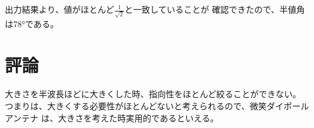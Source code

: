 \documentclass[dvipdfmx,autodetect-engine,titlepage]{jsarticle}
\begin{document}
出力結果より、値がほとんど\begin{math}\frac{1}{\sqrt{2}}\end{math}と一致していることが
確認できたので、半値角は78°である。

\section{評論}

大きさを半波長ほどに大きくした時、指向性をほとんど絞ることができない。
つまりは、大きくする必要性がほとんどないと考えられるので、微笑ダイポールアンテナ
は、大きさを考えた時実用的であるといえる。
\end{document}
